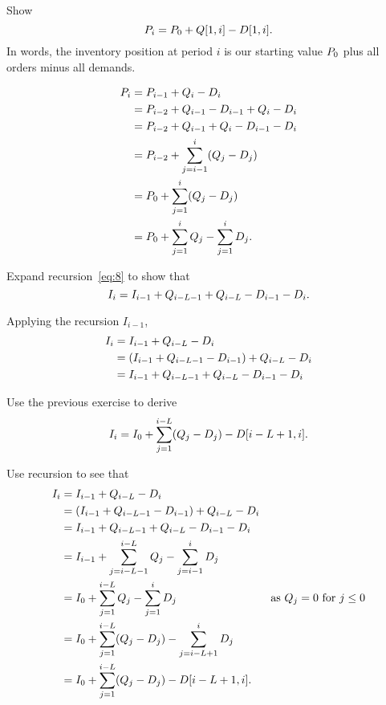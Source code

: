 \begin{exercise}
  Show 
  \begin{equation*}
    P_{i}= P_0 + Q[1, i] - D[1, i].
  \end{equation*}
In words, the inventory position at period $i$ is our starting value $P_0$ plus all orders minus all demands. 
  \begin{solution}
    \begin{align*}
    P_i
&= P_{i-1} + Q_i - D_i  \\
&= P_{i-2} + Q_{i-1} - D_{i-1} + Q_i - D_i  \\
&= P_{i-2} + Q_{i-1} +Q_i - D_{i-1} - D_i  \\
&= P_{i-2} + \sum_{j=i-1}^i (Q_{j} - D_{j}) \\
&= P_0 + \sum_{j=1}^{i} (Q_j-D_j) \\
&= P_0 + \sum_{j=1}^{i} Q_j- \sum_{j=1}^{i} D_j.
    \end{align*}
  \end{solution}
\end{exercise}

\begin{exercise}
Expand recursion~\eqref{eq:8} to show that 
\begin{equation*}
  I_{i} = I_{i-1}+Q_{i-L-1} + Q_{i-L} - D_{i-1} - D_i.
\end{equation*}
\begin{solution}
Applying the recursion $I_{i-1}$, 
\begin{align*}
  I_{i} 
&= I_{i-1} + Q_{i-L} - D_i \\
&= (I_{i-1}+Q_{i-L-1} - D_{i-1}) + Q_{i-L} - D_i \\
&= I_{i-1}+Q_{i-L-1} + Q_{i-L} - D_{i-1} - D_i \\
\end{align*}
  \end{solution}
\end{exercise}

\begin{exercise}
  Use the previous exercise to derive
  \begin{equation}
    I_i= I_0 + \sum_{j=1}^{i-L} (Q_j-D_j) - D[i-L+1, i].
  \end{equation}
  \begin{solution}
Use recursion to see that
\begin{align*}
  I_{i} 
&= I_{i-1} + Q_{i-L} - D_i \\
&= (I_{i-1}+Q_{i-L-1} - D_{i-1}) + Q_{i-L} - D_i \\
&= I_{i-1}+Q_{i-L-1} + Q_{i-L} - D_{i-1} - D_i \\
&= I_{i-1}+\sum_{j=i-L-1}^{i-L} Q_{j} - \sum_{j=i-1}^i D_{j} \\
&= I_{0}+\sum_{j=1}^{i-L} Q_{j} - \sum_{j=1}^i D_{j} &\text{as } Q_j = 0\text{ for } j\leq 0\\
&= I_{0}+\sum_{j=1}^{i-L} (Q_{j}-D_j) - \sum_{j=i-L+1}^i D_{j}\\
&= I_{0}+\sum_{j=1}^{i-L} (Q_{j}-D_j) - D[i-L+1, i].
\end{align*}
  \end{solution}
\end{exercise}


